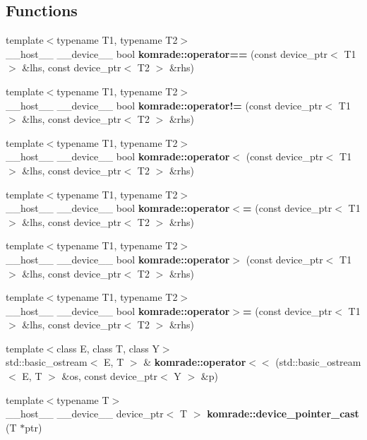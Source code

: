 \subsection*{Functions}
\begin{CompactItemize}
\item 
{\footnotesize template$<$typename T1, typename T2$>$ }\\\_\-\_\-host\_\-\_\- \_\-\_\-device\_\-\_\- bool {\bf komrade::operator==} (const device\_\-ptr$<$ T1 $>$ \&lhs, const device\_\-ptr$<$ T2 $>$ \&rhs)
\item 
{\footnotesize template$<$typename T1, typename T2$>$ }\\\_\-\_\-host\_\-\_\- \_\-\_\-device\_\-\_\- bool {\bf komrade::operator!=} (const device\_\-ptr$<$ T1 $>$ \&lhs, const device\_\-ptr$<$ T2 $>$ \&rhs)
\item 
{\footnotesize template$<$typename T1, typename T2$>$ }\\\_\-\_\-host\_\-\_\- \_\-\_\-device\_\-\_\- bool {\bf komrade::operator$<$} (const device\_\-ptr$<$ T1 $>$ \&lhs, const device\_\-ptr$<$ T2 $>$ \&rhs)
\item 
{\footnotesize template$<$typename T1, typename T2$>$ }\\\_\-\_\-host\_\-\_\- \_\-\_\-device\_\-\_\- bool {\bf komrade::operator$<$=} (const device\_\-ptr$<$ T1 $>$ \&lhs, const device\_\-ptr$<$ T2 $>$ \&rhs)
\item 
{\footnotesize template$<$typename T1, typename T2$>$ }\\\_\-\_\-host\_\-\_\- \_\-\_\-device\_\-\_\- bool {\bf komrade::operator$>$} (const device\_\-ptr$<$ T1 $>$ \&lhs, const device\_\-ptr$<$ T2 $>$ \&rhs)
\item 
{\footnotesize template$<$typename T1, typename T2$>$ }\\\_\-\_\-host\_\-\_\- \_\-\_\-device\_\-\_\- bool {\bf komrade::operator$>$=} (const device\_\-ptr$<$ T1 $>$ \&lhs, const device\_\-ptr$<$ T2 $>$ \&rhs)
\item 
{\footnotesize template$<$class E, class T, class Y$>$ }\\std::basic\_\-ostream$<$ E, T $>$ \& {\bf komrade::operator$<$$<$} (std::basic\_\-ostream$<$ E, T $>$ \&os, const device\_\-ptr$<$ Y $>$ \&p)
\item 
{\footnotesize template$<$typename T$>$ }\\\_\-\_\-host\_\-\_\- \_\-\_\-device\_\-\_\- device\_\-ptr$<$ T $>$ {\bf komrade::device\_\-pointer\_\-cast} (T $\ast$ptr)
\item 

\end{CompactItemize}
